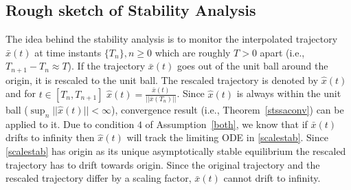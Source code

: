 \subsection{Rough sketch of Stability Analysis}
The idea behind the stability analysis is to monitor the interpolated trajectory $\bar{x}(t)$ at time instants $\{T_n\}, n\geq 0$ which are roughly $T>0$ apart (i.e., $T_{n+1}-T_n\approx T$). If the trajectory $\bar{x}(t)$ goes out of the unit ball around the origin, it is rescaled to the unit ball. The rescaled trajectory is denoted by $\hat{x}(t)$ and for $t \in [T_n,T_{n+1}]$ $\hat{x}(t)=\frac{\bar{x}(t)}{||\bar{x}(T_n)||}$. Since $\hat{x}(t)$ is always within the unit ball ($\sup_n||\hat{x}(t)|| <\infty$), convergence result (i.e., Theorem~\ref{stssaconv}) can be applied to it. Due to condition $4$ of Assumption~\ref{both}, we know that if $\bar{x}(t)$ drifts to infinity then $\hat{x}(t)$ will track the limiting ODE in \eqref{scalestab}. Since \eqref{scalestab} has origin as its unique asymptotically stable equilibrium the rescaled trajectory has to drift towards origin. Since the original trajectory and the rescaled trajectory differ by a scaling factor, $\bar{x}(t)$ cannot drift to infinity.
\begin{comment}
Application of stability result (Theorem~\ref{stssastab}) for the recursion in \eqref{couprec} is not straightforward due to the presence of two timescales $t^f$ and $t^s$. It is not clear whether one needs to rescale with respect to one of the timescales (faster/slower) or both. 
For instance, if we scale with respect to the faster timescale, we cannot immediately conclude the boundedness of $x_n$ because $y_n$ couples through $h(x_n,y_n)$ and we do not know about the boundedness of $y_n$. To add to the difficulty $y_n$ evolve along a slower timescale. In this paper, we tackle these issues by,
\begin{enumerate}
\item \textbf{Step 1:} First studying the interpolated trajectories with respect to the faster timescale and rescale them every $T^f_n$ time instants in the faster timescale, to show that the faster timescale iterates are bounded with a ball whose radius is proportional to the slower timescale iterates.
\item \textbf{Step 2:} Then studying the interpolated trajectories with respect to the slower timescale and rescale them every $T^s_n$ time instants in the slower timescale. Use result from \textbf{Step 1} to establish the boundedness of the slower timescale iterates and the boundedness of the faster timescale iterates follows automatically.
\end{enumerate}
We also make appropriate assumptions on the scaled ODEs.
\end{comment}
